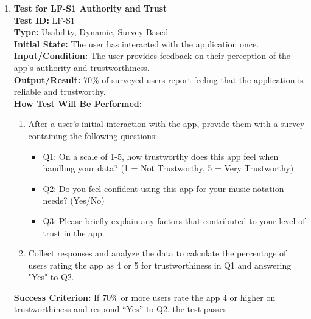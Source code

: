 \documentclass[12pt, titlepage]{article}
\begin{document}
\begin{enumerate}
    \item \textbf{Test for LF-S1 Authority and Trust} \\
      \newline
      \textbf{Test ID:} LF-S1 \\
      \textbf{Type:} Usability, Dynamic, Survey-Based \\
      \textbf{Initial State:} The user has interacted with the application once. \\
      \textbf{Input/Condition:} The user provides feedback on their perception of the app’s authority and trustworthiness. \\
      \textbf{Output/Result:} 70\% of surveyed users report feeling that the application is reliable and trustworthy. \\
      \textbf{How Test Will Be Performed:}
      \begin{enumerate}
          \item After a user’s initial interaction with the app, provide them with a survey containing the following questions:
          \begin{itemize}
              \item Q1: On a scale of 1-5, how trustworthy does this app feel when handling your data? (1 = Not Trustworthy, 5 = Very Trustworthy)
              \item Q2: Do you feel confident using this app for your music notation needs? (Yes/No)
              \item Q3: Please briefly explain any factors that contributed to your level of trust in the app.
          \end{itemize}
          \item Collect responses and analyze the data to calculate the percentage of users rating the app as 4 or 5 for trustworthiness in Q1 and answering "Yes" to Q2.
      \end{enumerate}
      \textbf{Success Criterion:} If 70\% or more users rate the app 4 or higher on trustworthiness and respond “Yes” to Q2, the test passes.
\end{enumerate}
\end{document}
